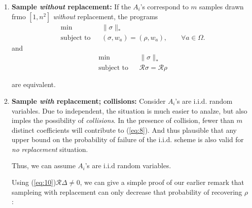 \documentclass{article}
\begin{document}
\begin{enumerate}
\item \textbf{Sample \textit{without} replacement:} If the $A_i$'s correspond to $m$ samples drawn frmo $[1,n^2]$ \textit{without} replacement, the programs
\begin{equation}
\begin{aligned}
& {\text{min}}
& & \| \sigma \|_* \\
& \text{subject to}
& & (\sigma, w_a) = (\rho, w_a) ,\qquad \forall a \in \Omega.
\end{aligned}
\end{equation}
and 
\begin{equation}
\begin{aligned}
&\text{min} 
&    &  \|\sigma\|_*\\
&\text{subject to} 
&     &\mathcal{R}\sigma = \mathcal{R}\rho
\end{aligned}
\end{equation}

are equivalent.

\item \textbf{Sample \textit{with} replacement; collisions:} Consider $A_i$'s are i.i.d. random variables. Due to independent, the situation is much easier to analze, but also imples the possibility of \textit{collisions}. In the presence of collision, fewer than $m$ distinct coefficients will contribute to (\ref{eq:8}). And thus plausible that any upper bound on the probability of failure of the i.i.d. scheme is also valid for \textit{no replacement} situation.

Thus, we can assume $A_i$'s are i.i.d random variables.

Using (\ref{eq:10})$\mathcal{R}\Delta \neq 0$, we can give a simple proof of our earlier remark that sampleing with replacement can only decrease that probability of recovering $\rho$:
\end{enumerate}
\end{document}
